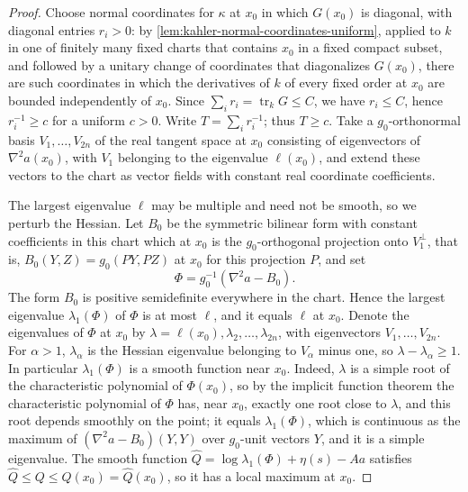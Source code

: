 \begin{proof}
Choose normal coordinates for $\kappa$ at $x_0$ in which $G(x_0)$ is diagonal, with diagonal entries $r_i>0$: by \cref{lem:kahler-normal-coordinates-uniform}, applied to $k$ in one of finitely many fixed charts that contains $x_0$ in a fixed compact subset, and followed by a unitary change of coordinates that diagonalizes $G(x_0)$, there are such coordinates in which the derivatives of $k$ of every fixed order at $x_0$ are bounded independently of $x_0$. Since $\sum_ir_i=\operatorname{tr}_kG\leq C$, we have $r_i\leq C$, hence $r_i^{-1}\geq c$ for a uniform $c>0$. Write $T=\sum_ir_i^{-1}$; thus $T\geq c$. Take a $g_0$-orthonormal basis $V_1,\ldots,V_{2n}$ of the real tangent space at $x_0$ consisting of eigenvectors of $\nabla^2a(x_0)$, with $V_1$ belonging to the eigenvalue $\ell(x_0)$, and extend these vectors to the chart as vector fields with constant real coordinate coefficients.

The largest eigenvalue $\ell$ may be multiple and need not be smooth, so we perturb the Hessian. Let $B_0$ be the symmetric bilinear form with constant coefficients in this chart which at $x_0$ is the $g_0$-orthogonal projection onto $V_1^\perp$, that is, $B_0(Y,Z)=g_0(PY,PZ)$ at $x_0$ for this projection $P$, and set
\[
 \Phi=g_0^{-1}(\nabla^2a-B_0).
\]
The form $B_0$ is positive semidefinite everywhere in the chart. Hence the largest eigenvalue $\lambda_1(\Phi)$ of $\Phi$ is at most $\ell$, and it equals $\ell$ at $x_0$. Denote the eigenvalues of $\Phi$ at $x_0$ by $\lambda=\ell(x_0),\lambda_2,\ldots,\lambda_{2n}$, with eigenvectors $V_1,\ldots,V_{2n}$. For $\alpha>1$, $\lambda_\alpha$ is the Hessian eigenvalue belonging to $V_\alpha$ minus one, so $\lambda-\lambda_\alpha\geq1$. In particular $\lambda_1(\Phi)$ is a smooth function near $x_0$. Indeed, $\lambda$ is a simple root of the characteristic polynomial of $\Phi(x_0)$, so by the implicit function theorem the characteristic polynomial of $\Phi$ has, near $x_0$, exactly one root close to $\lambda$, and this root depends smoothly on the point; it equals $\lambda_1(\Phi)$, which is continuous as the maximum of $(\nabla^2a-B_0)(Y,Y)$ over $g_0$-unit vectors $Y$, and it is a simple eigenvalue. The smooth function $\widehat Q=\log\lambda_1(\Phi)+\eta(s)-Aa$ satisfies $\widehat Q\leq Q\leq Q(x_0)=\widehat Q(x_0)$, so it has a local maximum at $x_0$.


\end{proof}
